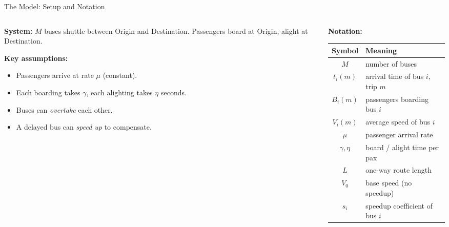 \documentclass[t, aspectratio=169]{beamer}
\begin{document}
\begin{frame}{The Model: Setup and Notation}
	\small
	\begin{columns}[T]
		\begin{column}{0.48\textwidth}
			\textbf{System:} $M$ buses shuttle between Origin and Destination. Passengers board at Origin, alight at Destination.

			\vspace{0.5em}
			\textbf{Key assumptions:}
			\begin{itemize}
				\item Passengers arrive at rate $\mu$ (constant).
				\item Each boarding takes $\gamma$, each alighting takes $\eta$ seconds.
				\item Buses can \emph{overtake} each other.
				\item A delayed bus can \emph{speed up} to compensate.
			\end{itemize}
		\end{column}
		\begin{column}{0.50\textwidth}
			\textbf{Notation:}

			\vspace{0.3em}
			\begin{tabular}{@{}cl@{}}
				\toprule
				Symbol & Meaning \\
				\midrule
				$M$        & number of buses \\
				$t_i(m)$   & arrival time of bus $i$, trip $m$ \\
				$B_i(m)$   & passengers boarding bus $i$ \\
				$V_i(m)$   & average speed of bus $i$ \\
				$\mu$      & passenger arrival rate \\
				$\gamma,\eta$ & board / alight time per pax \\
				$L$        & one-way route length \\
				$V_0$      & base speed (no speedup) \\
				$s_i$      & speedup coefficient of bus $i$ \\
				\bottomrule
			\end{tabular}
		\end{column}
	\end{columns}
\end{frame}
\end{document}
